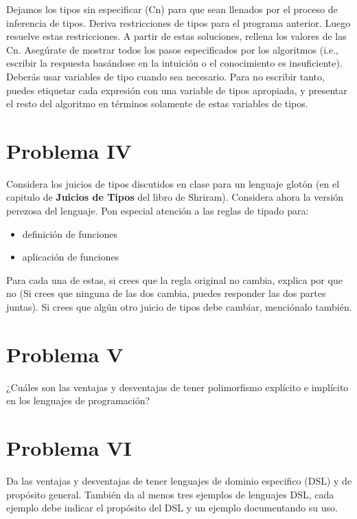 \documentclass{article}
\begin{document}
Dejamos los tipos sin especificar (Cn) para que sean llenados por el proceso
de inferencia de tipos. Deriva restricciones de tipos para el programa anterior.
Luego resuelve estas restricciones. A partir de estas soluciones, rellena los
valores de las Cn. Asegúrate de mostrar todos los pasos especificados por los
algoritmos (i.e., escribir la respuesta basándose en la intuición o el conocimiento
es insuficiente). Deberás usar variables de tipo cuando sea necesario.
Para no escribir tanto, puedes etiquetar cada expresión con una variable de tipos
apropiada, y presentar el resto del algoritmo en términos solamente de estas
variables de tipos.

\section*{Problema IV}
Considera los juicios de tipos discutidos en clase para un lenguaje glotón
(en el capitulo de \textbf{Juicios de Tipos} del libro de Shriram).
Considera ahora la versión perezosa del lenguaje. Pon especial atención a
las reglas de tipado para:

\begin{itemize}
\item definición de funciones
\item aplicación de funciones
\end{itemize}

Para cada una de estas, si crees que la regla original no cambia, explica por que no
(Si crees que ninguna de las dos cambia, puedes responder las dos partes juntas).
Si crees que algún otro juicio de tipos debe cambiar, menciónalo también.

\section*{Problema V}
¿Cuáles son las ventajas y desventajas de tener polimorfismo explícito e implícito
en los lenguajes de programación?

\section*{Problema VI}
Da las ventajas y desventajas de tener lenguajes de dominio especifico (DSL)
y de propósito general. También da al menos tres ejemplos de lenguajes DSL,
cada ejemplo debe indicar el propósito del DSL y un ejemplo documentando su uso.
\end{document}
